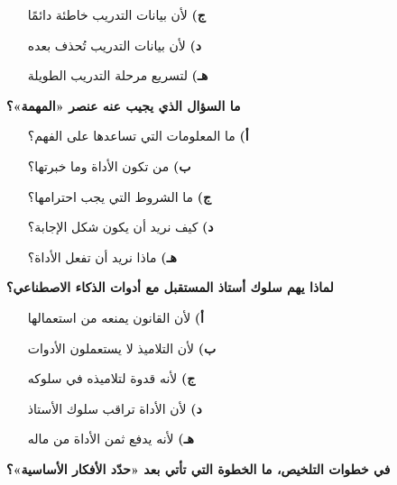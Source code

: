 \documentclass[11pt,a4paper]{article}
\begin{document}
\begin{multicols}{2}
\begin{minipage}{\linewidth}
\begin{itemize}[leftmargin=0.95cm, labelsep=4pt, itemsep=0pt, topsep=2pt, parsep=0pt]
  \item[\textbf{ج)}] لأن بيانات التدريب خاطئة دائمًا
  \item[\textbf{د)}] لأن بيانات التدريب تُحذف بعده
  \item[\textbf{هـ)}] لتسريع مرحلة التدريب الطويلة
\end{itemize}
\end{minipage}\par\vspace{7pt plus 4pt}
\noindent\begin{minipage}{\linewidth}
\hangindent=0.7cm\textbf{ما السؤال الذي يجيب عنه عنصر «المهمة»؟}
\begin{itemize}[leftmargin=0.95cm, labelsep=4pt, itemsep=0pt, topsep=2pt, parsep=0pt]
  \item[\textbf{أ)}] ما المعلومات التي تساعدها على الفهم؟
  \item[\textbf{ب)}] من تكون الأداة وما خبرتها؟
  \item[\textbf{ج)}] ما الشروط التي يجب احترامها؟
  \item[\textbf{د)}] كيف نريد أن يكون شكل الإجابة؟
  \item[\textbf{هـ)}] ماذا نريد أن تفعل الأداة؟
\end{itemize}
\end{minipage}\par\vspace{7pt plus 4pt}
\noindent\begin{minipage}{\linewidth}
\hangindent=0.7cm\textbf{لماذا يهم سلوك أستاذ المستقبل مع أدوات الذكاء الاصطناعي؟}
\begin{itemize}[leftmargin=0.95cm, labelsep=4pt, itemsep=0pt, topsep=2pt, parsep=0pt]
  \item[\textbf{أ)}] لأن القانون يمنعه من استعمالها
  \item[\textbf{ب)}] لأن التلاميذ لا يستعملون الأدوات
  \item[\textbf{ج)}] لأنه قدوة لتلاميذه في سلوكه
  \item[\textbf{د)}] لأن الأداة تراقب سلوك الأستاذ
  \item[\textbf{هـ)}] لأنه يدفع ثمن الأداة من ماله
\end{itemize}
\end{minipage}\par\vspace{7pt plus 4pt}
\noindent\begin{minipage}{\linewidth}
\hangindent=0.7cm\textbf{في خطوات التلخيص، ما الخطوة التي تأتي بعد «حدّد الأفكار الأساسية»؟}

\end{minipage}
\end{multicols}
\end{document}
